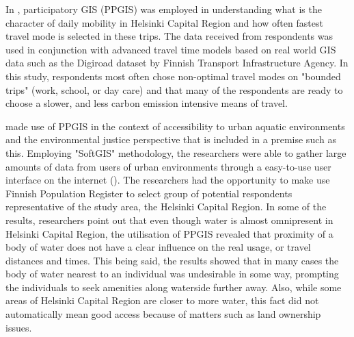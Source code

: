 In , participatory GIS (PPGIS) was employed in understanding what is the character of daily mobility in Helsinki Capital Region and how often fastest travel mode is selected in these trips. The data received from respondents was used in conjunction with advanced travel time models based on real world GIS data such as the Digiroad dataset by Finnish Transport Infrastructure Agency. In this study, respondents most often chose non-optimal travel modes on "bounded trips" (work, school, or day care) and that many of the respondents are ready to choose a slower, and less carbon emission intensive means of travel.

 made use of PPGIS in the context of accessibility to urban aquatic environments and the environmental justice perspective that is included in a premise such as this. Employing "SoftGIS" methodology, the researchers were able to gather large amounts of data from users of urban environments through a easy-to-use user interface on the internet (\cite{Kytta2011}). The researchers had the opportunity to make use Finnish Population Register to select group of potential respondents representative of the study area, the Helsinki Capital Region. In some of the results, researchers point out that even though water is almost omnipresent in Helsinki Capital Region, the utilisation of PPGIS revealed that proximity of a body of water does not have a clear influence on the real usage, or travel distances and times. This being said, the results showed that in many cases the body of water nearest to an individual was undesirable in some way, prompting the individuals to seek amenities along waterside further away. Also, while some areas of Helsinki Capital Region are closer to more water, this fact did not automatically mean good access because of matters such as land ownership issues.